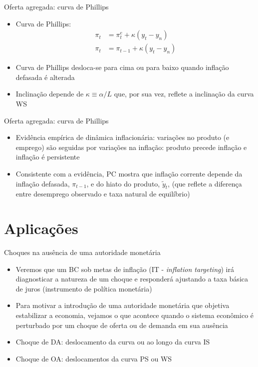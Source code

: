 \documentclass[10pt]{beamer}
\begin{document}
\begin{frame}
    {Oferta agregada: curva de Phillips}
    \begin{itemize}
        \item Curva de Phillips:
        \begin{align*}
            \pi_t &= \pi_t^e + \kappa(y_t - y_n) \\
            \pi_t &= \pi_{t-1} + \kappa(y_t - y_n) \tag{Expectativas adaptativas}
        \end{align*}
        \item Curva de Phillips desloca-se para cima ou para baixo quando inflação defasada é alterada\bigskip
        \item Inclinação depende de $\kappa \equiv \alpha/L$ que, por sua vez, reflete a inclinação da curva WS
    \end{itemize}
\end{frame}

\begin{frame}
    {Oferta agregada: curva de Phillips}
    \begin{itemize}
        \item Evidência empírica de dinâmica inflacionária: variações no produto (e emprego) são seguidas por variações na inflação: produto precede inflação e inflação é persistente\bigskip
        \item Consistente com a evidência, PC mostra que inflação corrente depende da inflação defasada, $\pi_{t-1}$, e do hiato do produto, $\tilde{y}_t$, (que reflete a diferença entre desemprego observado e taxa natural de equilíbrio)
    \end{itemize}
\end{frame}

\section{Aplicações}
\begin{frame}
    {Choques na ausência de uma autoridade monetária}
    \begin{itemize}
        \item Veremos que um BC sob metas de inflação (IT - \emph{inflation targeting}) irá diagnosticar a natureza de um choque e responderá ajustando a taxa básica de juros (instrumento de política monetária)\bigskip
        \item Para motivar a introdução de uma autoridade monetária que objetiva estabilizar a economia, vejamos o que acontece quando o sistema econômico é perturbado por um choque de oferta ou de demanda em sua ausência\bigskip
        \item Choque de DA: deslocamento da curva ou ao longo da curva IS\bigskip
        \item Choque de OA: deslocamentos da curva PS ou WS
    \end{itemize}
\end{frame}
\end{document}

